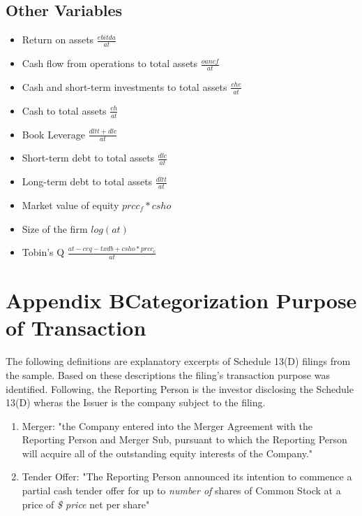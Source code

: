 \documentclass[12pt]{article}
\begin{document}
\begin{appendices}
	\subsection*{Other Variables}

	\begin{itemize}
	\renewcommand\labelitemi{--}
		\item Return on assets $\frac{ebitda}{at}$
		\item Cash flow from operations to total assets $\frac{oancf}{at}$
		\item Cash and short-term investments to total assets $\frac{che}{at}$
		\item Cash to total assets $\frac{ch}{at}$
		\item Book Leverage \citep[p.1440]{MacKay2005} $\frac{dltt+dlc}{at}$
		\item Short-term debt to total assets $\frac{dlc}{at}$ 
		\item Long-term debt to total assets $\frac{dltt}{at}$
		\item Market value of equity $prcc_f*csho$
		\item Size of the firm $log(at)$
		\item Tobin's Q \citep[p.120]{Khatami2014} $\frac{at-ceq-txdb+csho*prcc_c}{at}$
	\end{itemize}


\section*{Appendix B\indent Categorization Purpose of Transaction}

\noindent The following definitions are explanatory excerpts of Schedule 13(D) filings from the sample. Based on these descriptions the filing's transaction purpose was identified. Following, the Reporting Person is the investor disclosing the Schedule 13(D) wheras the Issuer is the company subject to the filing. 
\begin{enumerate}
	

\item Merger: "the Company entered into the Merger Agreement with the Reporting Person and Merger Sub, pursuant to which the Reporting Person will acquire all of the outstanding equity interests of the Company."

\item Tender Offer: "The Reporting Person announced its intention to commence a partial cash tender offer for up to \emph{number of} shares of Common Stock at a price of \emph{\$ price} net per share"


\end{enumerate}
\end{appendices}
\end{document}
